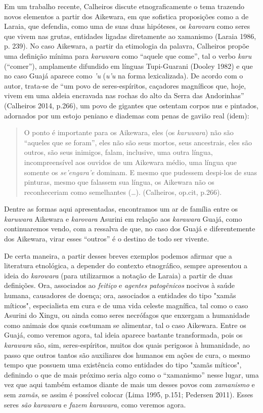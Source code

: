 Em um trabalho recente, Calheiros discute etnograficamente o tema
trazendo novos elementos a partir dos Aikewara, em que sofistica
proposições como a de Laraia, que defendia, como uma de suas duas
hipóteses, os \emph{karovara} como seres que vivem nas grutas, entidades
ligadas diretamente ao xamanismo (Laraia 1986, p. 239). No caso
Aikewara, a partir da etimologia da palavra, Calheiros propõe uma
definição mínima para \emph{karuwara} como ``aquele que come'', tal o
verbo \emph{karu} (``comer''), amplamente difundido em línguas
Tupi-Guarani (Dooley 1982) e que no caso Guajá aparece como \emph{'u}
(\emph{u'u} na forma lexicalizada). De acordo com o autor, trata-se de
``um povo de seres-espíritos, caçadores magníficos que, hoje, vivem em
uma aldeia encravada nas rochas do alto da Serra das Andorinhas''
(Calheiros 2014, p.266), um povo de gigantes que ostentam corpos nus e
pintados, adornados por um estojo peniano e diademas com penas de gavião
real (idem):

\begin{quote}
O ponto é importante para os Aikewara, eles (os \emph{karuwara}) não
são ``aqueles que se foram'', eles não são seus mortos, seus ancestrais,
eles são outros, são seus inimigos, falam, inclusive, uma outra língua,
incompreensível aos ouvidos de um Aikewara médio, uma língua que somente
os \emph{se'engara'e} dominam. E mesmo que pudessem despi-los de suas
pinturas, mesmo que falassem sua língua, os Aikewara não os
reconheceriam como semelhantes (\ldots{}). (Calheiros, op.cit, p.266).
\end{quote}

Dentre as formas aqui apresentadas, encontramos um ar de família entre
os \emph{karuwara} Aikewara e \emph{karovara} Asurini em relação aos
\emph{karawara} Guajá, como continuaremos vendo, com a ressalva de que,
no caso dos Guajá e diferentemente dos Aikewara, virar esses ``outros''
é o destino de todo ser vivente.

De certa maneira, a partir desses breves exemplos podemos afirmar que a
literatura etnológica, a depender do contexto etnográfico, sempre
apresentou a ideia do \emph{karowara} (para utilizarmos a notação de
Laraia) a partir de duas definições. Ora, associados ao \emph{feitiço} e
\emph{agentes patogênicos} nocivos à saúde humana, causadores de doença;
ora, associados a entidades do tipo "xamãs míticos", especialista em
cura e de uma vida celeste magnífica, tal como o caso Asurini do Xingu,
ou ainda como seres necrófagos que enxergam a humanidade como animais
dos quais costumam se alimentar, tal o caso Aikewara. Entre os Guajá,
como veremos agora, tal ideia aparece bastante transformada, pois os
\emph{karawara} são, sim, seres-espíritos, muitos dos quais perigosos à
humanidade, ao passo que outros tantos são auxiliares dos humanos em
ações de cura, o mesmo tempo que possuem uma existência como entidades
do tipo "xamãs míticos", definindo o que de mais próximo seria algo como
o ``xamanismo'' nesse lugar, uma vez que aqui também estamos diante de
mais um desses povos com \emph{xamanismo} e sem \emph{xamãs}, se assim é
possível colocar (Lima 1995, p.151; Pedersen 2011). Esses seres
\emph{são} \emph{karawara} e \emph{fazem} \emph{karawara}, como veremos
agora.

